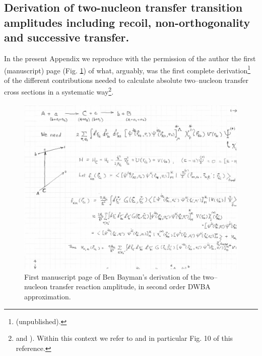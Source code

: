 \begin{subappendices}
\section[Bayman's two-nucleon transfer amplitudes]{Derivation of two-nucleon transfer transition amplitudes including recoil, non-orthogonality and successive transfer.}\label{C7AppO}
In the present Appendix we reproduce with the permission of the author the first (manuscript) page (Fig. \ref{fig5.h.1}) of what, arguably, was the first complete derivation\footnote{\cite{Bayman:70} (unpublished).} of the different contributions needed to calculate absolute two--nucleon transfer cross sections in a systematic way\footnote{ \cite{Bayman:71} and \cite{Bayman:82}). Within this context we refer to \cite{Broglia:73} and \cite{Potel:13} in particular Fig. 10 of this reference.}. 
\begin{figure}
\centerline{\includegraphics*[width=17cm,angle=0]{C7/figs_C7/fig5_H_1.pdf}}
\caption{First manuscript page of Ben Bayman's derivation of the two--nucleon transfer reaction amplitude, in second order DWBA approximation.}\label{fig5.h.1}
\end{figure}
\end{subappendices}
%
%